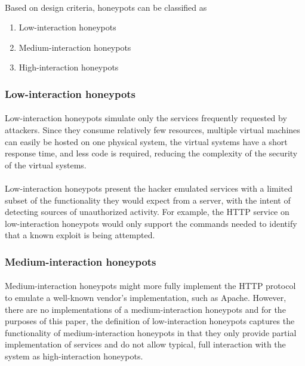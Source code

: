 \documentclass{report}
\begin{document}
\paragraph{}
Based on design criteria, honeypots can be classified as

\begin{enumerate}
\item Low-interaction honeypots
\item Medium-interaction honeypots
\item High-interaction honeypots
\end{enumerate}

\subsubsection{Low-interaction honeypots}
\paragraph{}
Low-interaction honeypots simulate only the services frequently requested by attackers. Since they consume relatively few resources, multiple virtual machines can easily be hosted on one physical system, the virtual systems have a short response time, and less code is required, reducing the complexity of the security of the virtual systems.
\paragraph{}
Low-interaction honeypots present the hacker emulated services with a limited subset of the functionality they would expect from a server, with the intent of detecting sources of unauthorized activity. For example, the HTTP service on low-interaction honeypots would only support the commands needed to identify that a known exploit is being attempted.

\subsubsection{Medium-interaction honeypots}
\paragraph{}
Medium-interaction honeypots  might more fully implement the HTTP protocol to emulate a well-known vendor’s implementation, such as Apache. However, there are no implementations of a medium-interaction honeypots and for the purposes of this paper, the definition of low-interaction honeypots captures the functionality of medium-interaction honeypots in that they only provide partial implementation of services and do not allow typical, full interaction with the system as high-interaction honeypots.
\end{document}
